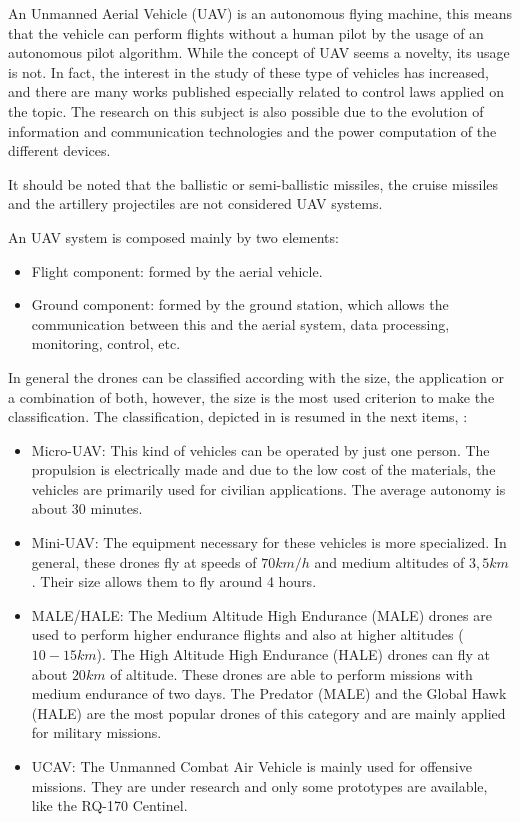  An Unmanned Aerial Vehicle (UAV) is an autonomous flying machine, this means that the vehicle can perform flights without a human pilot by the usage of an autonomous pilot algorithm. While the concept of UAV seems a novelty, its usage is not. In fact, the interest in the study of these type of vehicles has increased, and there are many works published especially related to control laws applied on the topic. The research on this subject is also possible due to the evolution of information and communication technologies and the power computation of the different devices.

It should be noted that the ballistic or semi-ballistic missiles, the cruise missiles and the artillery projectiles are not considered UAV systems.

An UAV system is composed mainly by two elements:
\begin{itemize}
  \item Flight component: formed by the aerial vehicle.
  \item Ground component: formed by the ground station, which allows the communication between this and the aerial system, data processing, monitoring, control, etc.
\end{itemize}

In general the drones can be classified according with the size, the application or a combination of both, however, the size is the most used criterion to make the classification. The classification, depicted in  is resumed in the next items, \cite{phdguerrero:2008}:
\begin{itemize}
  \item Micro-UAV: This kind of vehicles can be operated by just one person. The propulsion is electrically made and due to the low cost of the materials, the vehicles are primarily used for civilian applications. The average autonomy is about 30 minutes.
  \item Mini-UAV: The equipment necessary for these vehicles is more specialized. In general, these drones fly at speeds of $70km/h$ and medium altitudes of $3,5km$. Their size allows them to fly around 4 hours.
  \item MALE/HALE: The Medium Altitude High Endurance (MALE) drones are used to perform higher endurance flights and also at higher altitudes ($10-15km$). The High Altitude High Endurance (HALE) drones can fly at about $20km$ of altitude. These drones are able to perform missions with medium endurance of two days. The Predator (MALE) and the Global Hawk (HALE) are the most popular drones of this category and are mainly applied for military missions.
  \item UCAV: The Unmanned Combat Air Vehicle is mainly used for offensive missions. They are under research and only some prototypes are available, like the RQ-170 Centinel.
\end{itemize}


